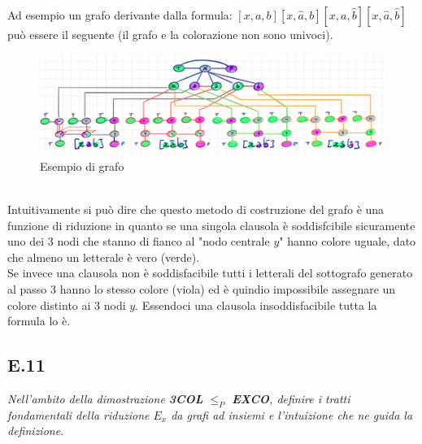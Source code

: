\documentclass[a4paper]{article}
\begin{document}
Ad esempio un grafo derivante dalla formula: $[x,a,b][x,\hat a, b][x,a,\hat b][x, \hat a, \hat b]$ può essere il seguente (il grafo e la colorazione non sono univoci).
		\begin{figure}[!ht]
		\centering
		\includegraphics[width = 1\textwidth]{./img/E10_finale.png}
		\caption{Esempio di grafo} \label{FIG:E10_finale}
		\end{figure}\\
Intuitivamente si può dire che questo metodo di costruzione del grafo è una funzione di riduzione in quanto se una singola clausola è soddisfcibile sicuramente uno dei 3 nodi che stanno di fianco al "nodo centrale $y$" hanno colore uguale, dato che almeno un letterale è vero (verde).\\
Se invece una clausola non è soddisfacibile tutti i letterali del sottografo generato al passo 3 hanno lo stesso colore (viola) ed è quindio impossibile assegnare un colore distinto ai 3 nodi $y$.
Essendoci una clausola insoddisfacibile tutta la formula lo è.
\subsection{E.11}
\emph{Nell’ambito della dimostrazione \textbf{3COL} $\leq_P$ \textbf{EXCO}, definire i tratti fondamentali della riduzione $E_x$ da grafi ad insiemi e l’intuizione che ne guida la definizione.}
\end{document}
